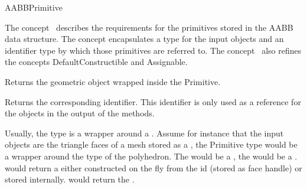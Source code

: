 \ccRefPageBegin


\begin{ccRefConcept}{AABBPrimitive}


\ccDefinition
  
The concept \ccRefName\ describes the requirements for the primitives stored in the AABB data structure. The concept encapsulates a type for the input objects and an identifier type by which those primitives are referred to. The concept \ccRefName\ also refines the concepts DefaultConstructible and Assignable.

\ccTypes





\ccOperations

{Returns the geometric object wrapped inside the Primitive.}

{Returns the corresponding identifier. This identifier is only used as a reference for the objects in the output of the  methods.}


\ccSeeAlso
{}

\ccExample

Usually, the  type is a wrapper around a . Assume for instance that the input objects are the triangle faces of a mesh stored as a , the Primitive type would be a wrapper around the   type of the polyhedron. The  would be a , the  would be a .  would return a  either constructed on the fly from the id (stored as face handle) or stored internally.  would return the . 

\end{ccRefConcept}

\ccRefPageEnd

